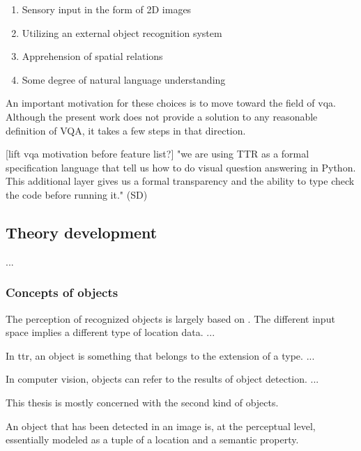 \documentclass[11pt, a4paper]{article}
\begin{document}
\begin{enumerate}
\item Sensory input in the form of 2D images
\item Utilizing an external object recognition system
\item Apprehension of spatial relations
\item Some degree of natural language understanding
\end{enumerate}

An important motivation for these choices is to move toward the field of \gls{vqa}.
Although the present work does not provide a solution to any reasonable definition of VQA, it takes a few steps in that direction.

[lift vqa motivation before feature list?]
"we are using TTR as a formal specification language that tell us how to do visual question answering in Python. This additional layer gives us a formal transparency and the ability to type check the code before running it." (SD)



\subsection{Theory development}
\label{ssec:theory}

...



\subsubsection{Concepts of objects}


The perception of recognized objects is largely based on \cite{lspc}.
The different input space implies a different type of location data.
...

In \gls{ttr}, an object is something that belongs to the extension of a type.
...

In computer vision, objects can refer to the results of object detection.
...

This thesis is mostly concerned with the second kind of objects.

An object that has been detected in an image is, at the perceptual level, essentially modeled as a tuple of a location and a semantic property.
\end{document}
